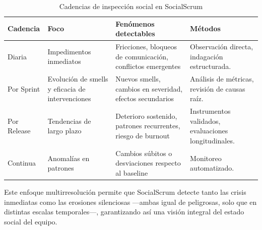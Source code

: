 \begin{table}[!htbp]
    \caption{Cadencias de inspección social en SocialScrum}
    \label{tab:inspeccion_cadencias}
    \centering
    \small
    \begin{tabular}{@{}p{2cm}p{3.5cm}p{4.5cm}p{3.5cm}@{}}
        \toprule
        \textbf{Cadencia}                                            & \textbf{Foco} & \textbf{Fenómenos detectables} & \textbf{Métodos} \\
        \midrule
        Diaria                                                       &
        Impedimentos inmediatos                                      &
        Fricciones, bloqueos de comunicación, conflictos emergentes  &
        Observación directa, indagación estructurada.                                                                                    \\
        \addlinespace
        Por Sprint                                                   &
        Evolución de smells y eficacia de intervenciones             &
        Nuevos smells, cambios en severidad, efectos secundarios     &
        Análisis de métricas, revisión de causas raíz.                                                                                   \\
        \addlinespace

        Por Release                                                  &
        Tendencias de largo plazo                                    &
        Deterioro sostenido, patrones recurrentes, riesgo de burnout &
        Instrumentos validados, evaluaciones longitudinales.                                                                             \\
        \addlinespace

        Continua                                                     &
        Anomalías en patrones                                        &
        Cambios súbitos o desviaciones respecto al baseline          &
        Monitoreo automatizado.                                                                                                          \\
        \bottomrule
    \end{tabular}
\end{table}

Este enfoque multirresolución permite que SocialScrum detecte tanto las crisis inmediatas como las erosiones silenciosas —ambas igual de peligrosas, solo que en distintas escalas temporales—, garantizando así una visión integral del estado social del equipo.

